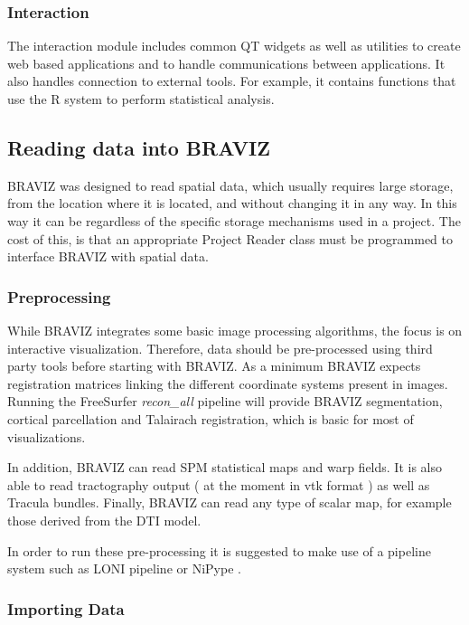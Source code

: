 \documentclass[twocolumn]{svjour3}
\begin{document}
\subsubsection{Interaction}

The interaction module includes common QT widgets as well as utilities to create web based applications and to handle communications between applications. It also handles connection to external tools. For example, it contains functions that use the R system to perform statistical analysis. 

\subsection{Reading data into BRAVIZ}

BRAVIZ was designed to read spatial data, which usually requires large storage, from the location where it is located, and without changing it in any way. In this way it can be regardless of the specific storage mechanisms used in a project. The cost of this, is that an appropriate Project Reader class must be programmed to interface BRAVIZ with spatial data.

\subsubsection{Preprocessing}

While BRAVIZ integrates some basic image processing algorithms, the focus is on interactive visualization. Therefore,  data should be pre-processed using third party tools before starting with BRAVIZ. As a minimum BRAVIZ expects registration matrices linking the different coordinate systems present in images. Running the FreeSurfer \emph{recon\_all} pipeline will provide BRAVIZ segmentation, cortical parcellation and Talairach registration, which is basic for most of visualizations. 

In addition, BRAVIZ can read SPM statistical maps and warp fields. It is also able to read tractography output ( at the moment in vtk format ) as well as Tracula bundles. Finally, BRAVIZ can read any type of scalar map, for example those derived from the DTI model.

In order to run these pre-processing it is suggested to make use of a pipeline system such as LONI pipeline \cite{dinov_efficient_2009} or NiPype \cite{gorgolewski_nipype:_2011}.

\subsubsection{Importing Data}
\end{document}
